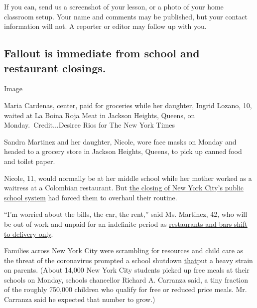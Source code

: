 If you can, send us a screenshot of your lesson, or a photo of your home
classroom setup. Your name and comments may be published, but your
contact information will not. A reporter or editor may follow up with
you.

\subsection{}

\hypertarget{fallout-is-immediate-from-school-and-restaurant-closings}{%
\subsection{Fallout is immediate from school and restaurant
closings.}\label{fallout-is-immediate-from-school-and-restaurant-closings}}

Image

Maria Cardenas, center, paid for groceries while her daughter, Ingrid
Lozano, 10, waited at La Boina Roja Meat in Jackson Heights, Queens, on
Monday.~Credit...Desiree Rios for The New York Times

Sandra Martinez and her daughter, Nicole, wore face masks on Monday and
headed to a grocery store in Jackson Heights, Queens, to pick up canned
food and toilet paper.

Nicole, 11, would normally be at her middle school while her mother
worked as a waitress at a Colombian restaurant. But
\href{https://www.nytimes3xbfgragh.onion/2020/03/15/nyregion/nyc-schools-closed.html}{the
closing of New York City's public school system} had forced them to
overhaul their routine.

``I'm worried about the bills, the car, the rent,'' said Ms. Martinez,
42, who will be out of work and unpaid for an indefinite period as
\href{https://www.nytimes3xbfgragh.onion/2020/03/15/nyregion/coronavirus-nyc-shutdown.html}{restaurants
and bars shift to delivery only}.

Families across New York City were scrambling for resources and child
care as the threat of the coronavirus prompted a school shutdown
\href{https://www.nytimes3xbfgragh.onion/2020/03/16/nyregion/nyc-schools-closed-coronavirus.html}{that}put
a heavy strain on parents. (About 14,000 New York City students picked
up free meals at their schools on Monday, schools chancellor Richard A.
Carranza said, a tiny fraction of the roughly 750,000 children who
qualify for free or reduced price meals. Mr. Carranza said he expected
that number to grow.)

